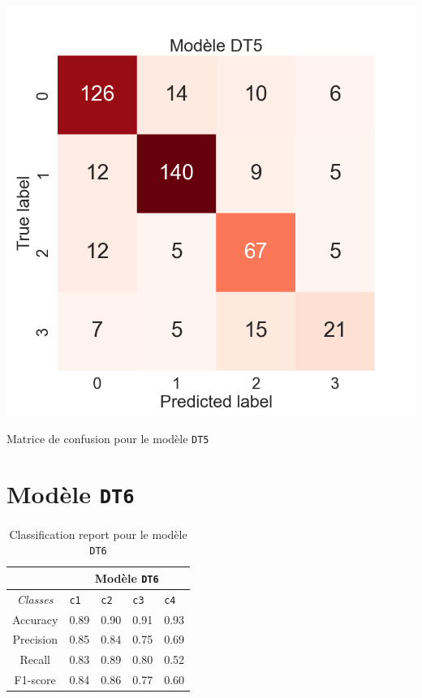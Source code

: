 \begin{table}[H]
    \includegraphics[scale=0.5]{images/y_pred_DT5.png}
    \caption{\label{HomePage} Matrice de confusion pour le modèle \texttt{DT5}}
\end{table}

\newpage

\section{Modèle \texttt{DT6}}

\begin{table}[ht]
  \begin{tabular}{ m{5em} | m{1cm}| m{1cm} | m{1cm}| m{1cm} | } 
  \cline{2-5}
             & \multicolumn{4}{|c|}{Modèle \texttt{DT6}}\\
 \hline
 \multicolumn{1}{|c|}{\textit{Classes}} & \hfil \texttt{c1} & \hfil \texttt{c2} & \hfil \texttt{c3} & \hfil \texttt{c4} \\ 
  \hline
  \multicolumn{1}{|c|}{Accuracy} & \hfil 0.89 & \hfil 0.90 & \hfil 0.91 & \hfil 0.93 \\ 
  \hline
  \multicolumn{1}{|c|}{Precision} & \hfil 0.85 & \hfil 0.84 & \hfil 0.75 & \hfil 0.69 \\ 
  \hline
  \multicolumn{1}{|c|}{Recall} & \hfil 0.83 & \hfil 0.89 & \hfil 0.80 & \hfil 0.52 \\ 
  \hline
  \multicolumn{1}{|c|}{F1-score} & \hfil 0.84 & \hfil 0.86 & \hfil 0.77 & \hfil 0.60 \\ 
  \hline
\end{tabular}
\caption{Classification report pour le modèle \texttt{DT6}}
  \label{Tab:Tcr}
\end{table}

